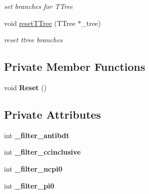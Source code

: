 \begin{DoxyCompactItemize}
\begin{DoxyCompactList}\small\item\em set branches for T\+Tree \end{DoxyCompactList}\item 
void \hyperlink{classanalysis_1_1EventFilter_a99015b9978acd533261fe430a404d8c6}{reset\+T\+Tree} (T\+Tree $\ast$\+\_\+tree)\hypertarget{classanalysis_1_1EventFilter_a99015b9978acd533261fe430a404d8c6}{}\label{classanalysis_1_1EventFilter_a99015b9978acd533261fe430a404d8c6}

\begin{DoxyCompactList}\small\item\em reset ttree branches \end{DoxyCompactList}\end{DoxyCompactItemize}
\subsection*{Private Member Functions}
\begin{DoxyCompactItemize}
\item 
void {\bfseries Reset} ()\hypertarget{classanalysis_1_1EventFilter_a76a10e3146f96ae5dbd857f4c2206c0f}{}\label{classanalysis_1_1EventFilter_a76a10e3146f96ae5dbd857f4c2206c0f}

\end{DoxyCompactItemize}
\subsection*{Private Attributes}
\begin{DoxyCompactItemize}
\item 
int {\bfseries \+\_\+filter\+\_\+antibdt}\hypertarget{classanalysis_1_1EventFilter_ae76a6b36afb8b0f561475ddae88793c4}{}\label{classanalysis_1_1EventFilter_ae76a6b36afb8b0f561475ddae88793c4}

\item 
int {\bfseries \+\_\+filter\+\_\+ccinclusive}\hypertarget{classanalysis_1_1EventFilter_a853fee14ca6d34e4838304cceac79c96}{}\label{classanalysis_1_1EventFilter_a853fee14ca6d34e4838304cceac79c96}

\item 
int {\bfseries \+\_\+filter\+\_\+ncpi0}\hypertarget{classanalysis_1_1EventFilter_abad74fed1241a740ee449c122f9d1a34}{}\label{classanalysis_1_1EventFilter_abad74fed1241a740ee449c122f9d1a34}

\item 
int {\bfseries \+\_\+filter\+\_\+pi0}\hypertarget{classanalysis_1_1EventFilter_a6dbef02b610bb170f36f06ae92e4400e}{}\label{classanalysis_1_1EventFilter_a6dbef02b610bb170f36f06ae92e4400e}

\end{DoxyCompactItemize}


